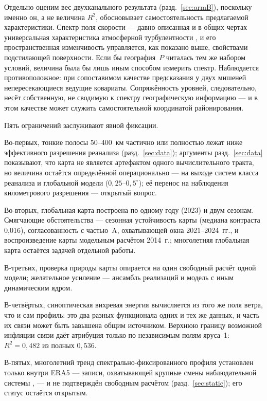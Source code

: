 \documentclass[11pt,a4paper]{article}
\begin{document}
Отдельно оценим вес двухканального результата (разд.~\ref{sec:armB}), поскольку именно он, а не величина $R^2$, обосновывает самостоятельность предлагаемой характеристики. Спектр поля скорости --- давно описанная и в общих чертах универсальная характеристика атмосферной турбулентности \cite{NastromGage1985,Lovejoy2011}, и его пространственная изменчивость управляется, как показано выше, свойствами подстилающей поверхности. Если бы география~$P$ читалась тем же набором условий, величина была бы лишь иным способом измерить спектр. Наблюдается противоположное: при сопоставимом качестве предсказания у двух мишеней непересекающиеся ведущие ковариаты. Сопряжённость уровней, следовательно, несёт собственную, не сводимую к спектру географическую информацию --- и в этом качестве может служить самостоятельной координатой районирования.

Пять ограничений заслуживают явной фиксации.

Во-первых, тонкие полосы 50--400~км частично или полностью лежат ниже эффективного разрешения реанализа (разд.~\ref{sec:data}); аргументы разд.~\ref{sec:data} показывают, что карта не является артефактом одного вычислительного тракта, но величина остаётся определённой операционально --- на выходе систем класса реанализа и глобальной модели ($0{,}25$--$0{,}5^\circ$); её перенос на наблюдения километрового разрешения --- открытый вопрос.

Во-вторых, глобальная карта построена по одному году (2023) и двум сезонам. Смягчающие обстоятельства --- сезонная устойчивость карты (медиана контраста 0,016), согласованность с частью~A, охватывающей окна 2021--2024~гг., и воспроизведение карты модельным расчётом 2014~г.; многолетняя глобальная карта остаётся задачей отдельной работы.

В-третьих, проверка природы карты опирается на один свободный расчёт одной модели; желательное усиление --- ансамбль реализаций и модель с иным динамическим ядром.

В-четвёртых, синоптическая вихревая энергия вычисляется из того же поля ветра, что и сам профиль: это два разных функционала одних и тех же данных, и часть их связи может быть завышена общим источником. Верхнюю границу возможной инфляции связи даёт атрибуция только по независимым полям яруса~1: $R^2=0{,}482$ из полных $0{,}536$.

В-пятых, многолетний тренд спектрально-фиксированного профиля установлен только внутри ERA5 --- записи, охватывающей крупные смены наблюдательной системы \cite{Bengtsson2004}, --- и не подтверждён свободным расчётом (разд.~\ref{sec:static}); его статус остаётся открытым.
\end{document}
